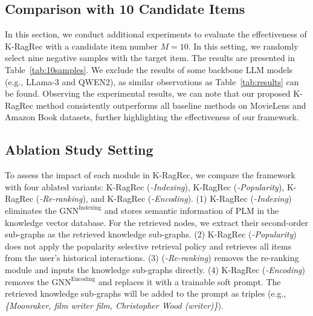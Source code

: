 \subsection{Comparison with 10 Candidate Items}\label{appendix:10samples}
In this section, we conduct additional experiments to evaluate the effectiveness of K-RagRec with a candidate item number $M=10$. In this setting, we randomly select nine negative samples with the target item. The results are presented in Table~\ref{tab:10samples}. We exclude the results of some backbone LLM models (e.g., LLama-3 and QWEN2), as similar observations as Table~\ref{tab:results} can be found. Observing the experimental results, we can note that our proposed K-RagRec method consistently outperforms all baseline methods on MovieLens and Amazon Book datasets, further highlighting the effectiveness of our framework.



\subsection{Ablation Study Setting}\label{appendix:Abla}
To assess the impact of each module in K-RagRec, we compare the framework with four ablated variants: K-RagRec (\textit{-Indexing}), K-RagRec (\textit{-Popularity}), K-RagRec (\textit{-Re-ranking}), and K-RagRec (\textit{-Encoding}). (1) K-RagRec (\textit{-Indexing}) eliminates the $\text{GNN}^{\text{Indexing}}$ and stores semantic information of PLM in the knowledge vector database. For the retrieved nodes, we extract their second-order sub-graphs as the retrieved knowledge sub-graphs. (2) K-RagRec (\textit{-Popularity}) does not apply the popularity selective retrieval policy and retrieves all items from the user's historical interactions. (3) (\textit{-Re-ranking}) removes the re-ranking module and inputs the knowledge sub-graphs directly. (4) K-RagRec (\textit{-Encoding}) removes the $\text{GNN}^{\text{Encoding}}$ and replaces it with a trainable soft prompt. The retrieved knowledge sub-graphs will be added to the prompt as triples (e.g., \textit{\{Moonraker, film writer film, Christopher Wood (writer)\}}).


